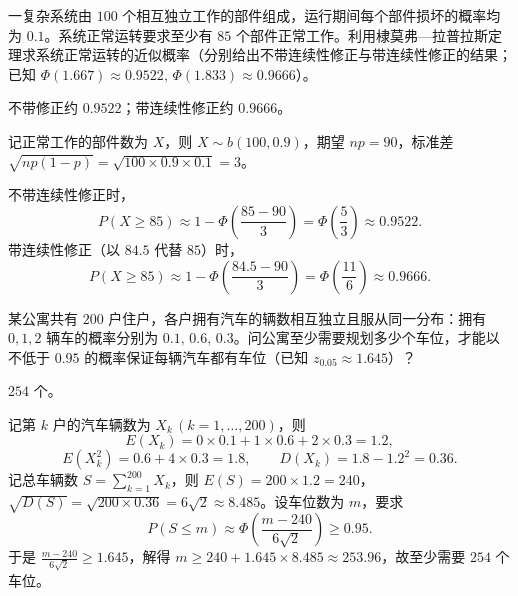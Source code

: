 \begin{exercise}
一复杂系统由 $100$ 个相互独立工作的部件组成，运行期间每个部件损坏的概率均为 $0.1$。系统正常运转要求至少有 $85$ 个部件正常工作。利用棣莫弗—拉普拉斯定理求系统正常运转的近似概率（分别给出不带连续性修正与带连续性修正的结果；已知 $\Phi(1.667)\approx 0.9522,\,\Phi(1.833)\approx 0.9666$）。
\begin{answer}
不带修正约 $0.9522$；带连续性修正约 $0.9666$。
\end{answer}
\begin{solution}
记正常工作的部件数为 $X$，则 $X\sim b(100,0.9)$，期望 $np=90$，标准差 $\sqrt{np(1-p)}=\sqrt{100\times 0.9\times 0.1}=3$。

不带连续性修正时，
\[
  P(X\ge 85)\approx 1-\Phi\!\left(\frac{85-90}{3}\right)=\Phi\!\left(\frac{5}{3}\right)\approx 0.9522.
\]
带连续性修正（以 $84.5$ 代替 $85$）时，
\[
  P(X\ge 85)\approx 1-\Phi\!\left(\frac{84.5-90}{3}\right)=\Phi\!\left(\frac{11}{6}\right)\approx 0.9666.
\]
\end{solution}
\end{exercise}

\begin{exercise}
某公寓共有 $200$ 户住户，各户拥有汽车的辆数相互独立且服从同一分布：拥有 $0,1,2$ 辆车的概率分别为 $0.1,\,0.6,\,0.3$。问公寓至少需要规划多少个车位，才能以不低于 $0.95$ 的概率保证每辆汽车都有车位（已知 $z_{0.05}\approx 1.645$）？
\begin{answer}
$254$ 个。
\end{answer}
\begin{solution}
记第 $k$ 户的汽车辆数为 $X_k\,(k=1,\ldots,200)$，则
\[
  E(X_k)=0\times 0.1+1\times 0.6+2\times 0.3=1.2,
\]
\[
  E(X_k^2)=0.6+4\times 0.3=1.8,\qquad D(X_k)=1.8-1.2^2=0.36.
\]
记总车辆数 $S=\sum_{k=1}^{200}X_k$，则 $E(S)=200\times 1.2=240$，$\sqrt{D(S)}=\sqrt{200\times 0.36}=6\sqrt{2}\approx 8.485$。设车位数为 $m$，要求
\[
  P(S\le m)\approx\Phi\!\left(\frac{m-240}{6\sqrt{2}}\right)\ge 0.95.
\]
于是 $\frac{m-240}{6\sqrt{2}}\ge 1.645$，解得 $m\ge 240+1.645\times 8.485\approx 253.96$，故至少需要 $254$ 个车位。
\end{solution}
\end{exercise}

